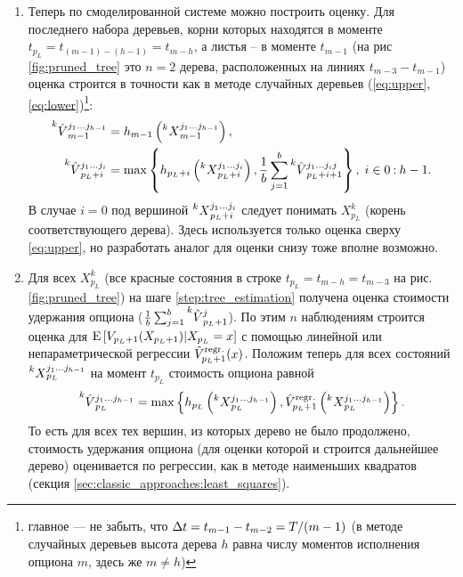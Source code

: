 \begin{enumerate}[noitemsep]
	\item\label{step:tree_estimation} Теперь по смоделированной системе можно построить оценку. Для последнего набора деревьев, корни которых находятся в моменте $t_{p_L} = t_{(m-1) - (h-1)} = t_{m-h}$, а листья -- в моменте $t_{m-1}$ (на рис\,\ref{fig:pruned_tree} это $n=2$ дерева, расположенных на линиях $t_{m-3}-t_{m-1}$) оценка строится в точности как в методе случайных деревьев (\ref{eq:upper},\,\ref{eq:lower})\footnote{главное --- не забыть, что $\Delta t = t_{m-1} - t_{m-2} = T / (m-1)$ (в методе случайных деревьев высота дерева $h$ равна числу моментов исполнения опциона $m$, здесь же $m \neq h$)}:
	\begin{equation}\label{eq:pruned_tree_upper}\begin{aligned}
	    \prescript{k}{}{\hat{V}}_{m-1}^{j_1 \ldots j_{h-1}} &= h_{m-1}\left(\prescript{k}{}{X}_{m-1}^{j_1 \ldots j_{h-1}}\right), \\
	    \prescript{k}{}{\hat{V}}_{p_L+i}^{j_1 \ldots j_i} &= \max \left\lbrace h_{p_L+i} \left( \prescript{k}{}{X}_{p_L+i}^{j_1 \ldots j_i} \right), \frac{1}{b} \sum_{j = 1}^b \prescript{k}{}{\hat{V}}_{p_L+i+1}^{j_1 \ldots j_i j}\right\rbrace,\;i\in{0\mathbin{:}{h-1}}.
	\end{aligned}\end{equation}
	В случае $i=0$ под вершиной $\prescript{k}{}{X}_{p_L+i}^{j_1 \ldots j_i}$ следует понимать $X_{p_L}^k$ (корень соответствующего дерева). Здесь используется только оценка сверху \eqref{eq:upper}, но разработать аналог для оценки снизу тоже вполне возможно.

	\item\label{step:estimate_continuation} Для всех $X_{p_L}^k$ (все красные состояния в строке $t_{p_L} = t_{m-h}=t_{m-3}$ на рис.\,\ref{fig:pruned_tree}) на шаге \ref{step:tree_estimation} получена оценка стоимости удержания опциона ($\frac{1}{b} \sum_{j = 1}^b \prescript{k}{}{\hat{V}}_{p_L+1}^{j}$). По этим $n$ наблюдениям строится оценка для 
	$\mathrm{E}\left[V_{p_L+1}(X_{p_L+1}) \middle\vert X_{p_L} = x \right]$ с помощью линейной или непараметрической регрессии $\hat{V}^{\mathrm{regr}.}_{p_L+1}(x)$. Положим теперь для всех состояний $\prescript{k}{}{X}_{p_L}^{j_1 \ldots j_{h-1}}$ на момент $t_{p_L}$ стоимость опциона равной 
	$$\prescript{k}{}{\hat{V}}_{p_L}^{j_1 \ldots j_{h-1}} = \max\left\lbrace h_{p_L}\left(\prescript{k}{}{X}_{p_L}^{j_1 \ldots j_{h-1}}\right), \hat{V}^{\mathrm{regr}.}_{p_L+1}\left(\prescript{k}{}{X}_{p_L}^{j_1 \ldots j_{h-1}}\right)\right\rbrace.$$
	То есть для всех тех вершин, из которых дерево не было продолжено, стоимость удержания опциона (для оценки которой и строится дальнейшее дерево) оценивается по регрессии, как в методе наименьших квадратов (секция \ref{sec:classic_approaches:least_squares}).


\end{enumerate}
